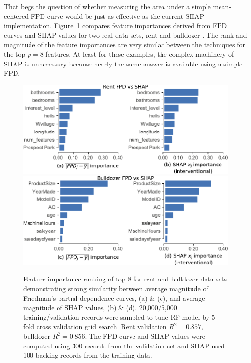\documentclass[11pt]{article}
\newcommand{\figref}[1]{Figure~\ref{#1}}
\begin{document}
That begs the question of whether measuring the area under a simple mean-centered FPD curve would be just as effective as the current SHAP implementation.  \figref{fig:fpd_imp} compares feature importances derived from FPD curves and SHAP values for two real data sets, rent \cite{rent} and bulldozer \cite{bulldozer}. The rank and magnitude of the feature importances are very similar between the techniques for the top  $p=8$ features. At least for these examples, the complex machinery of SHAP is unnecessary because nearly the same answer is available using a simple FPD. 

\begin{figure}[htbp]
\begin{center}
\includegraphics[scale=0.53]{images/rent-pdp-vs-shap.pdf}\includegraphics[scale=0.53]{images/bulldozer-pdp-vs-shap.pdf}
\caption[short]{\small  Feature importance ranking of top 8 for rent and bulldozer data sets demonstrating strong similarity between average magnitude of Friedman's partial dependence curves, (a) \& (c), and average magnitude of SHAP values, (b) \& (d). 20,000/5,000 training/validation records were sampled to tune RF model by 5-fold cross validation grid search. Rent validation $R^2 = 0.857$, bulldozer $R^2 = 0.856$. The FPD curve and SHAP values were computed using 300 records from the validation set and SHAP used 100 backing records from the training data.}
\label{fig:fpd_imp}
\end{center}
\end{figure}
\end{document}
